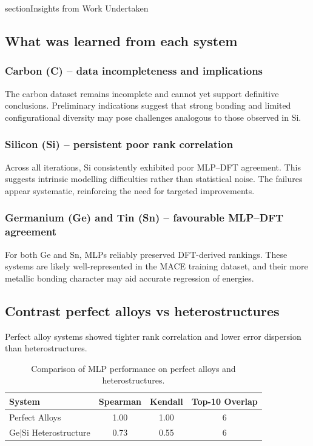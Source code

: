 section{Insights from Work Undertaken} \label{section:insights_from_work}

\subsection{What was learned from each system}

\subsubsection{Carbon (C) – data incompleteness and implications}

The carbon dataset remains incomplete and cannot yet support definitive conclusions. Preliminary indications suggest that strong bonding and limited configurational diversity may pose challenges analogous to those observed in Si.

\subsubsection{Silicon (Si) – persistent poor rank correlation}

Across all iterations, Si consistently exhibited poor MLP--DFT agreement. This suggests intrinsic modelling difficulties rather than statistical noise. The failures appear systematic, reinforcing the need for targeted improvements.

\subsubsection{Germanium (Ge) and Tin (Sn) – favourable MLP--DFT agreement}

For both Ge and Sn, MLPs reliably preserved DFT-derived rankings. These systems are likely well-represented in the MACE training dataset, and their more metallic bonding character may aid accurate regression of energies.

\subsection{Contrast perfect alloys vs heterostructures}

Perfect alloy systems showed tighter rank correlation and lower error dispersion than heterostructures.

\begin{table}[h]
    \centering
    \caption{Comparison of MLP performance on perfect alloys and heterostructures.}
    \begin{tabular}{lccc}
        System & Spearman & Kendall & Top-10 Overlap \\
        \hline
        Perfect Alloys & 1.00 & 1.00 & 6 \\
        Ge|Si Heterostructure & 0.73 & 0.55 & 6 \\
    \end{tabular}
\end{table}